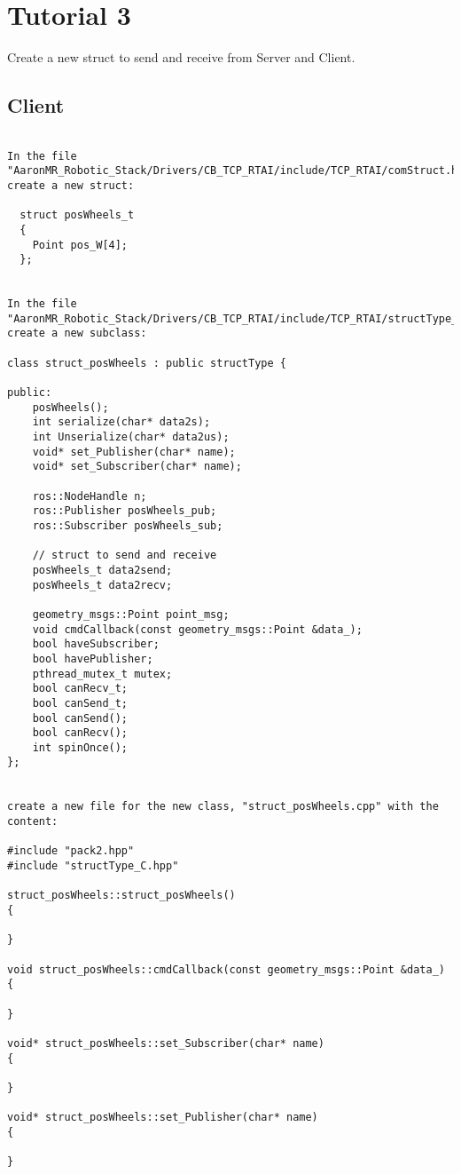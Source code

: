 \chapter*{Tutorial 3}

Create a new struct to send and receive from Server and Client.

\section{Client}
\begin{verbatim}

In the file "AaronMR_Robotic_Stack/Drivers/CB_TCP_RTAI/include/TCP_RTAI/comStruct.h" create a new struct:

  struct posWheels_t
  {
    Point pos_W[4];
  };


In the file "AaronMR_Robotic_Stack/Drivers/CB_TCP_RTAI/include/TCP_RTAI/structType_C.hpp", create a new subclass:

class struct_posWheels : public structType {

public:
    posWheels();
    int serialize(char* data2s);
    int Unserialize(char* data2us);
    void* set_Publisher(char* name);
    void* set_Subscriber(char* name);

    ros::NodeHandle n;
    ros::Publisher posWheels_pub;
    ros::Subscriber posWheels_sub;

    // struct to send and receive
    posWheels_t data2send;
    posWheels_t data2recv;

    geometry_msgs::Point point_msg;
    void cmdCallback(const geometry_msgs::Point &data_);
    bool haveSubscriber;
    bool havePublisher;
    pthread_mutex_t mutex;
    bool canRecv_t;
    bool canSend_t;
    bool canSend();
    bool canRecv();
    int spinOnce();
};


create a new file for the new class, "struct_posWheels.cpp" with the content:

#include "pack2.hpp"
#include "structType_C.hpp"

struct_posWheels::struct_posWheels()
{

}

void struct_posWheels::cmdCallback(const geometry_msgs::Point &data_)
{

}

void* struct_posWheels::set_Subscriber(char* name)
{

}

void* struct_posWheels::set_Publisher(char* name)
{

}


\end{verbatim}
